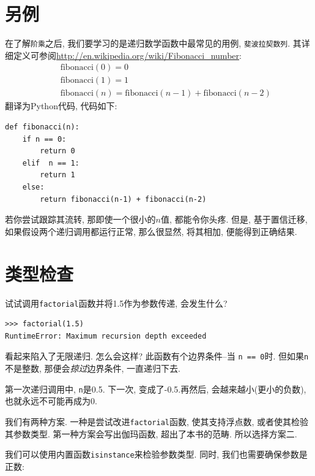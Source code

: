 \documentclass[10pt]{book}
\begin{document}
\section{另例}
\label{one.more.example}

在了解{\tt 阶乘}之后, 我们要学习的是递归数学函数中最常见的用例, 
{\tt 斐波拉契数列}. 
其详细定义可参阅\url{http://en.wikipedia.org/wiki/Fibonacci_number}:
%
\begin{eqnarray*}
&& \mathrm{fibonacci}(0) = 0 \\
&& \mathrm{fibonacci}(1) = 1 \\
&& \mathrm{fibonacci}(n) = \mathrm{fibonacci}(n-1) + \mathrm{fibonacci}(n-2)
\end{eqnarray*}
%
翻译为Python代码, 代码如下:

\begin{verbatim}
def fibonacci(n):
    if n == 0:
        return 0
    elif  n == 1:
        return 1
    else:
        return fibonacci(n-1) + fibonacci(n-2)
\end{verbatim}
%
若你尝试跟踪其流转, 那即使一个很小的$n$值, 都能令你头疼. 
但是, 基于置信迁移, 如果假设两个递归调用都运行正常, 那么很显然, 
将其相加, 便能得到正确结果. 


\section{类型检查}
\label{guardian}

试试调用{\tt factorial}函数并将1.5作为参数传递, 会发生什么?

\begin{verbatim}
>>> factorial(1.5)
RuntimeError: Maximum recursion depth exceeded
\end{verbatim}
%
看起来陷入了无限递归. 怎么会这样? 此函数有个边界条件--当 {\tt n == 0}时. 
但如果{\tt n}不是整数, 那便会{\em 掠过}边界条件, 一直递归下去. 

第一次递归调用中, { \tt n}是0.5. 
下一次, 变成了-0.5.再然后, 会越来越小(更小的负数), 
也就永远不可能再成为0.

我们有两种方案. 一种是尝试改进{\tt factorial}函数, 使其支持浮点数, 
或者使其检验其参数类型. 
第一种方案会写出伽玛函数, 超出了本书的范畴. 所以选择方案二. 

我们可以使用内置函数{\tt isinstance}来检验参数类型. 
同时, 我们也需要确保参数是正数:
\end{document}
